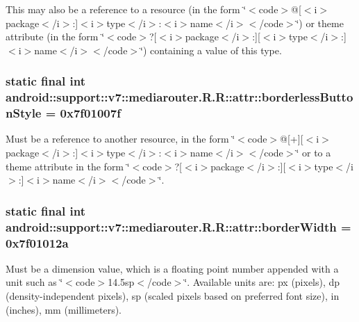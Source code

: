 This may also be a reference to a resource (in the form \char`\"{}$<$code$>$@\mbox{[}$<$i$>$package$<$/i$>$:\mbox{]}$<$i$>$type$<$/i$>$:$<$i$>$name$<$/i$>$$<$/code$>$\char`\"{}) or theme attribute (in the form \char`\"{}$<$code$>$?\mbox{[}$<$i$>$package$<$/i$>$:\mbox{]}\mbox{[}$<$i$>$type$<$/i$>$:\mbox{]}$<$i$>$name$<$/i$>$$<$/code$>$\char`\"{}) containing a value of this type. \hypertarget{classandroid_1_1support_1_1v7_1_1mediarouter_1_1_r_1_1attr_28faac7fd4f62f4471f4c23ed610772c}{
\subsubsection[{borderlessButtonStyle}]{\setlength{\rightskip}{0pt plus 5cm}static final int android::support::v7::mediarouter.R.R::attr::borderlessButtonStyle = 0x7f01007f}}
\label{classandroid_1_1support_1_1v7_1_1mediarouter_1_1_r_1_1attr_28faac7fd4f62f4471f4c23ed610772c}


Must be a reference to another resource, in the form \char`\"{}$<$code$>$@\mbox{[}+\mbox{]}\mbox{[}$<$i$>$package$<$/i$>$:\mbox{]}$<$i$>$type$<$/i$>$:$<$i$>$name$<$/i$>$$<$/code$>$\char`\"{} or to a theme attribute in the form \char`\"{}$<$code$>$?\mbox{[}$<$i$>$package$<$/i$>$:\mbox{]}\mbox{[}$<$i$>$type$<$/i$>$:\mbox{]}$<$i$>$name$<$/i$>$$<$/code$>$\char`\"{}. \hypertarget{classandroid_1_1support_1_1v7_1_1mediarouter_1_1_r_1_1attr_06230d0b3bf879d3f58c157184148e05}{
\subsubsection[{borderWidth}]{\setlength{\rightskip}{0pt plus 5cm}static final int android::support::v7::mediarouter.R.R::attr::borderWidth = 0x7f01012a}}
\label{classandroid_1_1support_1_1v7_1_1mediarouter_1_1_r_1_1attr_06230d0b3bf879d3f58c157184148e05}


Must be a dimension value, which is a floating point number appended with a unit such as \char`\"{}$<$code$>$14.5sp$<$/code$>$\char`\"{}. Available units are: px (pixels), dp (density-independent pixels), sp (scaled pixels based on preferred font size), in (inches), mm (millimeters). 

